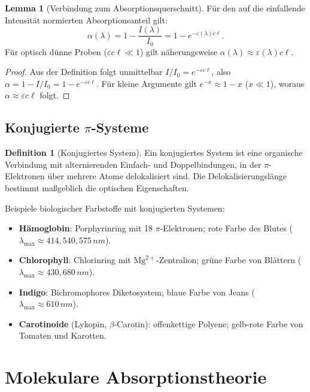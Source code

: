 ﻿\documentclass[a4paper,12pt]{article}
\theoremstyle{definition}
\newtheorem{definition}{Definition}
\newtheorem{lemma}{Lemma}
\begin{document}
\begin{lemma}[Verbindung zum Absorptionsquerschnitt]
\label{lem:querschnitt}
Für den auf die einfallende Intensität normierten Absorptionsanteil gilt:
\[
  \alpha(\lambda) = 1 - \frac{I(\lambda)}{I_0} = 1 - e^{-\varepsilon(\lambda) c \ell}.
\]
Für optisch dünne Proben ($\varepsilon c \ell \ll 1$) gilt näherungsweise
$\alpha(\lambda) \approx \varepsilon(\lambda) c \ell$.
\end{lemma}

\begin{proof}
Aus der Definition folgt unmittelbar $I/I_0 = e^{-\varepsilon c \ell}$, also
$\alpha = 1 - I/I_0 = 1 - e^{-\varepsilon c \ell}$.
Für kleine Argumente gilt $e^{-x} \approx 1 - x$ ($x \ll 1$), woraus
$\alpha \approx \varepsilon c \ell$ folgt.
\end{proof}

\subsection{Konjugierte $\pi$-Systeme}

\begin{definition}[Konjugiertes System]
Ein konjugiertes System ist eine organische Verbindung mit alternierenden Einfach- und
Doppelbindungen, in der $\pi$-Elektronen über mehrere Atome delokalisiert sind.
Die Delokalisierungslänge bestimmt maßgeblich die optischen Eigenschaften.
\end{definition}

Beispiele biologischer Farbstoffe mit konjugierten Systemen:
\begin{itemize}
  \item \textbf{Hämoglobin}: Porphyrinring mit 18 $\pi$-Elektronen; rote Farbe des Blutes ($\lambda_{\max} \approx 414, 540, 575\,\si{nm}$).
  \item \textbf{Chlorophyll}: Chlorinring mit $\mathrm{Mg}^{2+}$-Zentralion; grüne Farbe von Blättern ($\lambda_{\max} \approx 430, 680\,\si{nm}$).
  \item \textbf{Indigo}: Bichromophores Diketosystem; blaue Farbe von Jeans ($\lambda_{\max} \approx 610\,\si{nm}$).
  \item \textbf{Carotinoide} (Lykopin, $\beta$-Carotin): offenkettige Polyene; gelb-rote Farbe von Tomaten und Karotten.
\end{itemize}

\section{Molekulare Absorptionstheorie}
\end{document}
